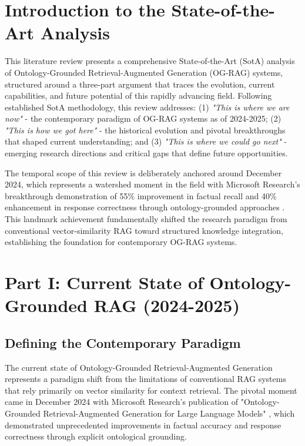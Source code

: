 
\section{Introduction to the State-of-the-Art Analysis}

This literature review presents a comprehensive State-of-the-Art (SotA) analysis of Ontology-Grounded Retrieval-Augmented Generation (OG-RAG) systems, structured around a three-part argument that traces the evolution, current capabilities, and future potential of this rapidly advancing field. Following established SotA methodology, this review addresses: (1) \textit{"This is where we are now"} - the contemporary paradigm of OG-RAG systems as of 2024-2025; (2) \textit{"This is how we got here"} - the historical evolution and pivotal breakthroughs that shaped current understanding; and (3) \textit{"This is where we could go next"} - emerging research directions and critical gaps that define future opportunities.

The temporal scope of this review is deliberately anchored around December 2024, which represents a watershed moment in the field with Microsoft Research's breakthrough demonstration of 55\% improvement in factual recall and 40\% enhancement in response correctness through ontology-grounded approaches \cite{chen2024og}. This landmark achievement fundamentally shifted the research paradigm from conventional vector-similarity RAG toward structured knowledge integration, establishing the foundation for contemporary OG-RAG systems.

\section{Part I: Current State of Ontology-Grounded RAG (2024-2025)}
\subsection{Defining the Contemporary Paradigm}

The current state of Ontology-Grounded Retrieval-Augmented Generation represents a paradigm shift from the limitations of conventional RAG systems that rely primarily on vector similarity for context retrieval. The pivotal moment came in December 2024 with Microsoft Research's publication of "Ontology-Grounded Retrieval-Augmented Generation for Large Language Models" \cite{chen2024og}, which demonstrated unprecedented improvements in factual accuracy and response correctness through explicit ontological grounding.

